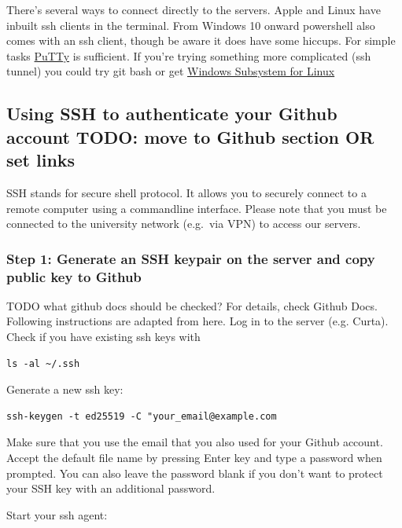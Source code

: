 \documentclass[
]{book}
\begin{document}
There's several ways to connect directly to the servers. Apple and Linux
have inbuilt ssh clients in the terminal. From Windows 10 onward
powershell also comes with an ssh client, though be aware it does have
some hiccups. For simple tasks
\href{https://www.chiark.greenend.org.uk/~sgtatham/putty/}{PuTTy} is
sufficient. If you're trying something more complicated (ssh tunnel) you
could try git bash or get \href{https://docs.microsoft.com/en-us/windows/wsl/about}{Windows Subsystem for
Linux}

\subsection{Using SSH to authenticate your Github account TODO: move to Github section OR set links}\label{using-ssh-to-authenticate-your-github-account-todo-move-to-github-section-or-set-links}

SSH stands for secure shell protocol. It allows you to securely connect
to a remote computer using a commandline interface. Please note that you
must be connected to the university network (e.g.~via VPN) to access our
servers.

\subsubsection{Step 1: Generate an SSH keypair on the server and copy public key to Github}\label{step-1-generate-an-ssh-keypair-on-the-server-and-copy-public-key-to-github}

TODO what github docs should be checked? For details, check Github Docs.
Following instructions are adapted from here. Log in to the server (e.g.
Curta). Check if you have existing ssh keys with

\begin{verbatim}
ls -al ~/.ssh
\end{verbatim}

Generate a new ssh key:

\begin{verbatim}
ssh-keygen -t ed25519 -C "your_email@example.com
\end{verbatim}

Make sure that you use the email that you also used for your Github
account. Accept the default file name by pressing Enter key and type a
password when prompted. You can also leave the password blank if you
don't want to protect your SSH key with an additional password.

Start your ssh agent:
\end{document}
